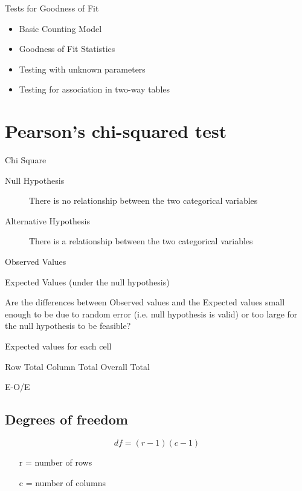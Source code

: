 Tests for Goodness of Fit
\begin{itemize}
\item Basic Counting Model
\item Goodness of Fit Statistics
\item Testing with unknown parameters
\item Testing for association in two-way tables
\end{itemize}

\section{Pearson's chi-squared test}

Chi Square

\begin{description}
\item[Null Hypothesis]
There is no relationship between the two categorical variables

\item[Alternative Hypothesis]
There is a relationship between the two categorical variables
\end{description}

Observed Values

Expected Values (under the null hypothesis)

Are the differences between Observed values and the Expected values
small enough to be due to random error (i.e. null hypothesis is valid)
or too large for the null hypothesis to be feasible?

Expected values for each cell

Row Total Column Total
Overall Total

E-O/E

\subsection{Degrees of freedom}

\[df=(r-1)(c-1)\]

\begin{itemize}
\item[r] = number of rows
\item[c] = number of columns
\end{itemize}

